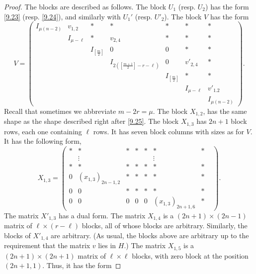 \documentclass[12pts]{amsart}
\begin{document}
\begin{proof}
The blocks are described as follows. The block $U_1$ (resp. $U_2$) has the form \eqref{9.23} (resp. \eqref{9.24}),  
and similarly with $U_1'$ (resp. $U'_2$). The block $V$ has the form
\begin{equation}\label{11.12}
V=\begin{pmatrix}I_{\mu(n-2)}&v_{1,2}&\ast&\ast&\ast&\ast&\ast\\&I_{\mu-\ell}&\ast&v_{2,4}&\ast&\ast&\ast\\&&I_{[\frac{m}{2}]}&0&0&\ast&\ast\\&&&I_{2([\frac{m+1}{2}]-r-\ell)}&0&v'_{2,4}&\ast\\&&&&I_{[\frac{m}{2}]}&\ast&\ast\\&&&&&I_{\mu-\ell}&v'_{1.2}\\&&&&&&I_{\mu(n-2)}\end{pmatrix}.
\end{equation}
Recall that sometimes we abbreviate $m-2r=\mu$. The block $X_{1,2}$, has the same shape as the shape described right after \eqref{9.25}. 
The block $X_{1,3}$ has $2n+1$ block rows, each one containing $\ell$ rows. It has seven block columns with sizes as for $V$. It has the following form,
\begin{equation}\label{11.13}
X_{1,3}=\begin{pmatrix}\ast&\ast&\ast&\ast&\ast&\ast&\ast\\&\vdots&&&&\vdots&&\\\ast&\ast&\ast&\ast&\ast&\ast&\ast\\0&(x_{1,3})_{2n-1,2}&\ast&\ast&\ast&\ast&\ast\\0&0&\ast&\ast&\ast&\ast&\ast\\0&0&0&0&0&(x_{1,3})_{2n+1,6}&\ast\end{pmatrix}.
\end{equation}
The matrix $X'_{1,3}$ has a dual form. The matrix $X_{1,4}$ is a $(2n+1)\times (2n-1)$ matrix of $\ell\times (r-\ell)$ blocks, all of whose blocks are arbitrary.  Similarly, the blocks of $X'_{1,4}$ are arbitrary. (As usual, the blocks above are arbitrary up to the requirement that the matrix $v$ lies in $H$.) The matrix $X_{1,5}$ is a $(2n+1)\times (2n+1)$ matrix of $\ell\times \ell$ blocks, with zero block at the position $(2n+1,1)$. Thus, it has the form


\end{proof}
\end{document}
